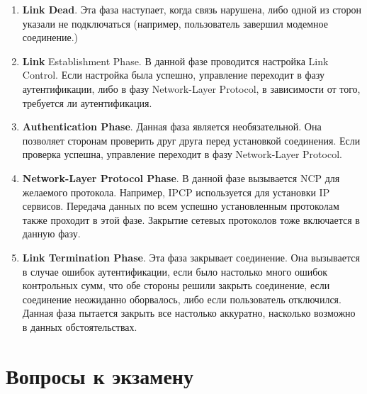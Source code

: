 \documentclass[12pt, russian, oneside, article]{ncc}
\begin{document}
\begin{itemize}
\begin{itemize}
\begin{enumerate}
\item \textbf{Link Dead}. Эта фаза наступает, когда связь нарушена, либо одной из сторон указали не подключаться (например, пользователь завершил модемное соединение.)
\item \textbf{Link} Establishment Phase. В данной фазе проводится настройка Link Control. Если настройка была успешно, управление переходит в фазу аутентификации, либо в фазу Network-Layer Protocol, в зависимости от того, требуется ли аутентификация.
\item \textbf{Authentication Phase}. Данная фаза является необязательной. Она позволяет сторонам проверить друг друга перед установкой соединения. Если проверка успешна, управление переходит в фазу Network-Layer Protocol.
\item \textbf{Network-Layer Protocol Phase}. В данной фазе вызывается NCP для желаемого протокола. Например, IPCP используется для установки IP сервисов. Передача данных по всем успешно установленным протоколам также проходит в этой фазе. Закрытие сетевых протоколов тоже включается в данную фазу.
\item \textbf{Link Termination Phase}. Эта фаза закрывает соединение. Она вызывается в случае ошибок аутентификации, если было настолько много ошибок контрольных сумм, что обе стороны решили закрыть соединение, если соединение неожиданно оборвалось, либо если пользователь отключился. Данная фаза пытается закрыть все настолько аккуратно, насколько возможно в данных обстоятельствах.
\end{enumerate}
\end{itemize} %
\end{itemize} %
\section{Вопросы к экзамену}
\label{sec-6}
\end{document}
